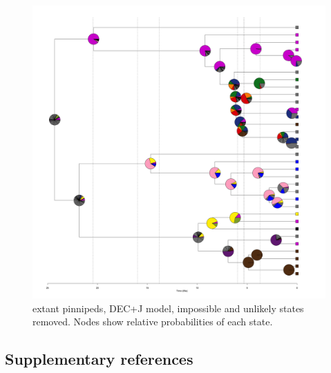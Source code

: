 \documentclass[a4paper, 12pt]{article}
\begin{document}
\begin{figure}[H]
 \centering
  \includegraphics[width = \linewidth]{figures/extant-pinnipeds-DECj-unlikely-pies.png}
 \caption{extant pinnipeds, DEC+J model, impossible and unlikely states removed. Nodes show relative probabilities of each state.}
  \label{fig-extant-decj-pie-unlikely}
\end{figure} 

\newpage
\subsection{Supplementary references}
 


\end{document}
